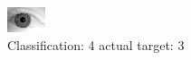 \begin{figure}[h!]
\begin{center}
\includegraphics[width=0.60\columnwidth]{figures/ID2053_class_4_target_3.png}
\end{center}
\caption{ Classification: 4 actual target: 3}
\label{fig:ID2053_class_4_target_3}
\end{figure}
